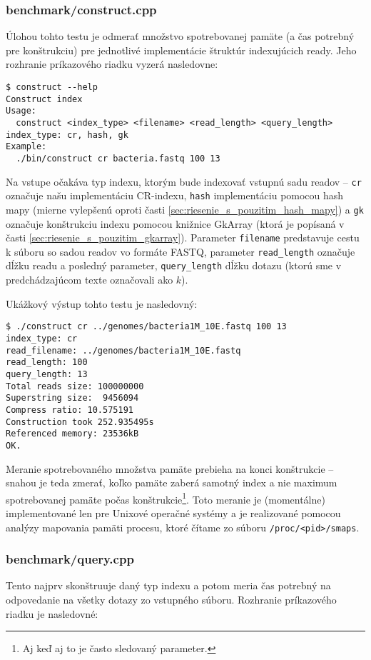 \subsubsection{benchmark/construct.cpp}
Úlohou tohto testu je odmerať množstvo spotrebovanej pamäte (a čas potrebný pre konštrukciu) pre jednotlivé implementácie štruktúr indexujúcich ready. Jeho rozhranie príkazového riadku vyzerá nasledovne:

\begin{verbatim}
$ construct --help
Construct index 
Usage: 
  construct <index_type> <filename> <read_length> <query_length>
index_type: cr, hash, gk
Example: 
  ./bin/construct cr bacteria.fastq 100 13
\end{verbatim}

Na vstupe očakáva typ indexu, ktorým bude indexovať vstupnú sadu readov -- \texttt{cr} označuje našu implementáciu CR-indexu, \texttt{hash} implementáciu pomocou hash mapy (mierne vylepšenú oproti časti \ref{sec:riesenie_s_pouzitim_hash_mapy}) a \texttt{gk} označuje konštrukciu indexu pomocou knižnice GkArray (ktorá je popísaná v časti \ref{sec:riesenie_s_pouzitim_gkarray}). Parameter \texttt{filename} predstavuje cestu k súboru so sadou readov vo formáte FASTQ, parameter \texttt{read\_length} označuje dĺžku readu a posledný parameter, \texttt{query\_length} dĺžku dotazu (ktorú sme v predchádzajúcom texte označovali ako $k$).

Ukážkový výstup tohto testu je nasledovný:

\begin{verbatim}
$ ./construct cr ../genomes/bacteria1M_10E.fastq 100 13                                                       
index_type: cr
read_filename: ../genomes/bacteria1M_10E.fastq
read_length: 100
query_length: 13
Total reads size: 100000000
Superstring size:  9456094
Compress ratio: 10.575191
Construction took 252.935495s
Referenced memory: 23536kB
OK.
\end{verbatim}

Meranie spotrebovaného množstva pamäte prebieha na konci konštrukcie -- snahou je teda zmerať, koľko pamäte zaberá samotný index a nie maximum spotrebovanej pamäte počas konštrukcie\footnote{Aj keď aj to je často sledovaný parameter.}. Toto meranie je (momentálne) implementované len pre Unixové operačné systémy a je realizované pomocou analýzy mapovania pamäti procesu, ktoré čítame zo súboru \texttt{/proc/<pid>/smaps}.

\subsubsection{benchmark/query.cpp}
Tento najprv skonštruuje daný typ indexu a potom meria čas potrebný na odpovedanie na všetky dotazy zo vstupného súboru. Rozhranie príkazového riadku je nasledovné:


